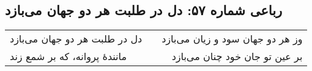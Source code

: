 \begin{center}
\section*{رباعی شماره ۵۷: دل در طلبت هر دو جهان می‌بازد}
\label{sec:057}
\begin{longtable}{l p{0.5cm} r}
دل در طلبت هر دو جهان می‌بازد
&&
وز هر دو جهان سود و زیان می‌بازد
\\
مانندهٔ پروانه، که بر شمع زند
&&
بر عین تو جان خود چنان می‌بازد
\\
\end{longtable}
\end{center}
